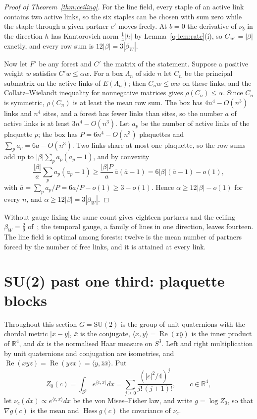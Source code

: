 \documentclass[11pt]{amsart}
\theoremstyle{definition}
\theoremstyle{remark}
\numberwithin{equation}{section}
\newcommand{\R}{\mathbb{R}}
\newcommand{\SU}{\mathrm{SU}}
\newcommand{\Hess}{\operatorname{Hess}}
\newcommand{\ip}[2]{\langle #1,#2\rangle}
\begin{document}
\begin{proof}[Proof of Theorem~\ref{thm:ceiling}]
For the line field, every staple of an active link contains two active
links, so the six staples can be chosen with sum zero while the staple
through a given partner $e'$ moves freely. At $b=0$ the derivative of $\nu_b$
in the direction $h$ has Kantorovich norm $\frac14|h|$ by Lemma~\ref{q-lem:rate}(i),
so $C_{ee'}=|\beta|$ exactly, and every row sum is $12|\beta|=3|\beta_W|$.

Now let $F'$ be any forest and $C'$ the matrix of the statement. Suppose a
positive weight $w$ satisfies $C'w\le\alpha w$. For a box $\Lambda_n$ of side
$n$ let $C_n$ be the principal submatrix on the active links of $E(\Lambda_n)$;
then $C_nw\le\alpha w$ on these links, and the Collatz--Wielandt inequality
for nonnegative matrices gives $\rho(C_n)\le\alpha$. Since $C_n$ is symmetric,
$\rho(C_n)$ is at least the mean row sum. The box has $4n^4-O(n^3)$ links and
$n^4$ sites, and a forest has fewer links than sites, so the number $a$ of
active links is at least $3n^4-O(n^3)$. Let $a_p$ be the number of active
links of the plaquette $p$; the box has $P=6n^4-O(n^3)$ plaquettes and
$\sum_pa_p=6a-O(n^3)$. Two links share at most one plaquette, so the row
sums add up to $|\beta|\sum_pa_p(a_p-1)$, and by convexity
\[
\frac{|\beta|}a\sum_pa_p(a_p-1)\ge\frac{|\beta|P}a\,\bar a(\bar a-1)
=6|\beta|(\bar a-1)-o(1),
\]
with $\bar a=\sum_pa_p/P=6a/P-o(1)\ge3-o(1)$. Hence $\alpha\ge12|\beta|-o(1)$
for every $n$, and $\alpha\ge12|\beta|=3|\beta_W|$.
\end{proof}

Without gauge fixing the same count gives eighteen partners and the ceiling
$\beta_W=\frac29$ of~\cite[Prop.~13]{BB26a}; the temporal gauge, a family of
lines in one direction, leaves fourteen. The line field is optimal among
forests: twelve is the mean number of partners forced by the number of free
links, and it is attained at every link.

\section{SU(2) past one third: plaquette blocks}\label{sec:plaqblocks}

Throughout this section $G=\SU(2)$ is the group of unit quaternions with
the chordal metric $|x-y|$, $\bar x$ is the conjugate, $\ip xy=\operatorname{Re}
(x\bar y)$ is the inner product of $\R^4$, and $dx$ is the normalised Haar
measure on $S^3$. Left and right multiplication by unit quaternions and
conjugation are isometries, and $\operatorname{Re}(xyz)=\operatorname{Re}
(yzx)=\ip y{\bar z\bar x}$. Put
\[
Z_0(c)=\int_{S^3}e^{\ip cx}dx=\sum_{j\ge0}\frac{(|c|^2/4)^j}{j!\,(j+1)!},
\qquad c\in\R^4,
\]
let $\nu_c(dx)\propto e^{\ip cx}dx$ be the von Mises--Fisher law, and write
$g=\log Z_0$, so that $\nabla g(c)$ is the mean and $\Hess g(c)$ the
covariance of $\nu_c$.
\end{document}
